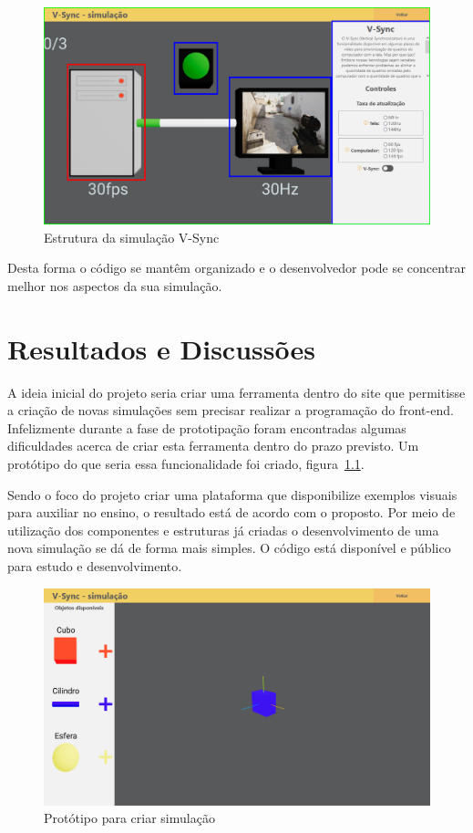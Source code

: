 \documentclass[tcc,capa]{texufpel}
\begin{document}
\begin{figure}[htbp]
  \centering \includegraphics[scale=.3]{Navegacao/pagina_simulacao_estrutura.png}
  \caption{Estrutura da simulação V-Sync}
  \label{pagina_simulacao_estrutura}
\end{figure}

Desta forma o código se mantêm organizado e o desenvolvedor pode se concentrar melhor nos aspectos da sua simulação. 

\chapter{Resultados e Discussões}
\label{cap: resultados_e_discussoes}

A ideia inicial do projeto seria criar uma ferramenta dentro do site que permitisse a criação de novas simulações sem precisar realizar a programação do front-end. Infelizmente durante a fase de prototipação foram encontradas algumas dificuldades acerca de criar esta ferramenta dentro do prazo previsto. Um protótipo do que seria essa funcionalidade foi criado, figura~\ref{prototipo_criar_simulacao}. 

Sendo o foco do projeto criar uma plataforma que disponibilize exemplos visuais para auxiliar no ensino, o resultado está de acordo com o proposto. Por meio de utilização dos componentes e estruturas já criadas o desenvolvimento de uma nova simulação se dá de forma mais simples. O código está disponível e público para estudo e desenvolvimento.

\begin{figure}[htbp]
  \centering \includegraphics[scale=.2]{Navegacao/pagina_criar_simulacao.jpeg}
  \caption{Protótipo para criar simulação}
  \label{prototipo_criar_simulacao}
\end{figure}
\end{document}

